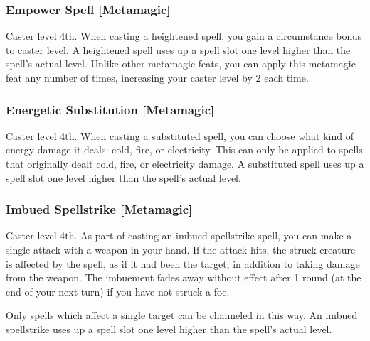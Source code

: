 \begin{comment}
\subsubsection{Extend Spell [Metamagic]}
\parhead{Prerequisite} Caster level 8th.
\parhead{Benefit} An extended spell has its duration increased by one duration category: from Short, to Medium, to Long, to Extreme. This metamagic can only be applied to spells with a duration of \durshort, \durmed, or \durlong. An extended spell uses up a spell slot three levels higher than the spell's actual level.
\end{comment}

\subsubsection{Empower Spell [Metamagic]}
 Caster level 4th.
 When casting a heightened spell, you gain a  circumstance bonus to caster level. A heightened spell uses up a spell slot one level higher than the spell's actual level. Unlike other metamagic feats, you can apply this metamagic feat any number of times, increasing your caster level by 2 each time.

\subsubsection{Energetic Substitution [Metamagic]}
 Caster level 4th.
 When casting a substituted spell, you can choose what kind of energy damage it deals: cold, fire, or electricity. This can only be applied to spells that originally dealt cold, fire, or electricity damage. A substituted spell uses up a spell slot one level higher than the spell's actual level.

\subsubsection{Imbued Spellstrike [Metamagic]}
 Caster level 4th.
 As part of casting an imbued spellstrike spell, you can make a single attack with a weapon in your hand. If the attack hits, the struck creature is affected by the spell, as if it had been the target, in addition to taking damage from the weapon. The imbuement fades away without effect after 1 round (at the end of your next turn) if you have not struck a foe.

Only spells which affect a single target can be channeled in this way. An imbued spellstrike uses up a spell slot one level higher than the spell's actual level.

